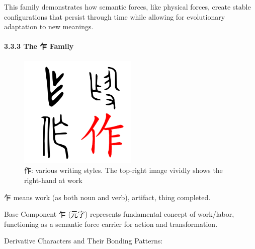\documentclass[
  11pt,
  letterpaper,
]{article}
\begin{document}
This family demonstrates how semantic forces, like physical forces,
create stable configurations that persist through time while allowing
for evolutionary adaptation to new meanings.

\paragraph{3.3.3 The 乍 Family}\label{the-ux4e4d-family}

\begin{figure}
\centering
\includegraphics[width=0.5\textwidth]{./images/zi_work.png}
\caption{作: various writing styles. The top-right image vividly shows the right-hand at work}
\end{figure}

乍 means work (as both noun and verb), artifact, thing completed.

Base Component 乍 (元字) represents fundamental concept of work/labor,
functioning as a semantic force carrier for action and transformation.

Derivative Characters and Their Bonding Patterns:
\end{document}
